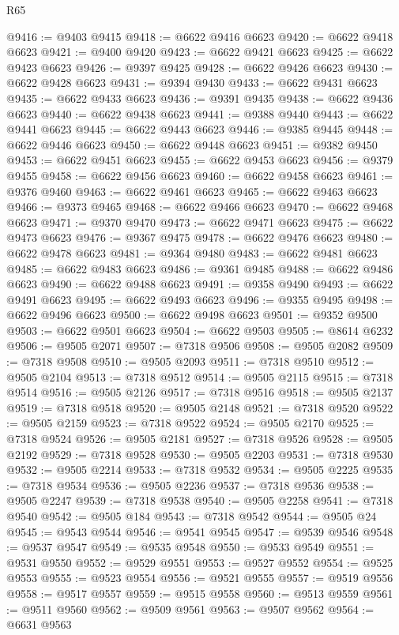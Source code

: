 \begin{lexlean}{R65}
\begin{coremodule}
{@9416 := @9403 @9415
@9418 := @6622 @9416 @6623
@9420 := @6622 @9418 @6623
@9421 := @9400 @9420
@9423 := @6622 @9421 @6623
@9425 := @6622 @9423 @6623
@9426 := @9397 @9425
@9428 := @6622 @9426 @6623
@9430 := @6622 @9428 @6623
@9431 := @9394 @9430
@9433 := @6622 @9431 @6623
@9435 := @6622 @9433 @6623
@9436 := @9391 @9435
@9438 := @6622 @9436 @6623
@9440 := @6622 @9438 @6623
@9441 := @9388 @9440
@9443 := @6622 @9441 @6623
@9445 := @6622 @9443 @6623
@9446 := @9385 @9445
@9448 := @6622 @9446 @6623
@9450 := @6622 @9448 @6623
@9451 := @9382 @9450
@9453 := @6622 @9451 @6623
@9455 := @6622 @9453 @6623
@9456 := @9379 @9455
@9458 := @6622 @9456 @6623
@9460 := @6622 @9458 @6623
@9461 := @9376 @9460
@9463 := @6622 @9461 @6623
@9465 := @6622 @9463 @6623
@9466 := @9373 @9465
@9468 := @6622 @9466 @6623
@9470 := @6622 @9468 @6623
@9471 := @9370 @9470
@9473 := @6622 @9471 @6623
@9475 := @6622 @9473 @6623
@9476 := @9367 @9475
@9478 := @6622 @9476 @6623
@9480 := @6622 @9478 @6623
@9481 := @9364 @9480
@9483 := @6622 @9481 @6623
@9485 := @6622 @9483 @6623
@9486 := @9361 @9485
@9488 := @6622 @9486 @6623
@9490 := @6622 @9488 @6623
@9491 := @9358 @9490
@9493 := @6622 @9491 @6623
@9495 := @6622 @9493 @6623
@9496 := @9355 @9495
@9498 := @6622 @9496 @6623
@9500 := @6622 @9498 @6623
@9501 := @9352 @9500
@9503 := @6622 @9501 @6623
@9504 := @6622 @9503
@9505 := @8614 @6232
@9506 := @9505 @2071
@9507 := @7318 @9506
@9508 := @9505 @2082
@9509 := @7318 @9508
@9510 := @9505 @2093
@9511 := @7318 @9510
@9512 := @9505 @2104
@9513 := @7318 @9512
@9514 := @9505 @2115
@9515 := @7318 @9514
@9516 := @9505 @2126
@9517 := @7318 @9516
@9518 := @9505 @2137
@9519 := @7318 @9518
@9520 := @9505 @2148
@9521 := @7318 @9520
@9522 := @9505 @2159
@9523 := @7318 @9522
@9524 := @9505 @2170
@9525 := @7318 @9524
@9526 := @9505 @2181
@9527 := @7318 @9526
@9528 := @9505 @2192
@9529 := @7318 @9528
@9530 := @9505 @2203
@9531 := @7318 @9530
@9532 := @9505 @2214
@9533 := @7318 @9532
@9534 := @9505 @2225
@9535 := @7318 @9534
@9536 := @9505 @2236
@9537 := @7318 @9536
@9538 := @9505 @2247
@9539 := @7318 @9538
@9540 := @9505 @2258
@9541 := @7318 @9540
@9542 := @9505 @184
@9543 := @7318 @9542
@9544 := @9505 @24
@9545 := @9543 @9544
@9546 := @9541 @9545
@9547 := @9539 @9546
@9548 := @9537 @9547
@9549 := @9535 @9548
@9550 := @9533 @9549
@9551 := @9531 @9550
@9552 := @9529 @9551
@9553 := @9527 @9552
@9554 := @9525 @9553
@9555 := @9523 @9554
@9556 := @9521 @9555
@9557 := @9519 @9556
@9558 := @9517 @9557
@9559 := @9515 @9558
@9560 := @9513 @9559
@9561 := @9511 @9560
@9562 := @9509 @9561
@9563 := @9507 @9562
@9564 := @6631 @9563
}
\end{coremodule}
\end{lexlean}
